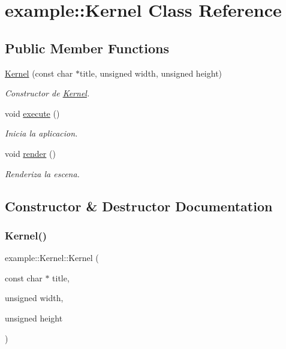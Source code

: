 \hypertarget{classexample_1_1_kernel}{}\section{example\+::Kernel Class Reference}
\label{classexample_1_1_kernel}
\subsection*{Public Member Functions}
\begin{DoxyCompactItemize}
\item 
\mbox{\hyperlink{classexample_1_1_kernel_afe9edad51a71f7cc57829a1f28f38c5f}{Kernel}} (const char $\ast$title, unsigned width, unsigned height)
\begin{DoxyCompactList}\small\item\em Constructor de \mbox{\hyperlink{classexample_1_1_kernel}{Kernel}}. \end{DoxyCompactList}\item 
void \mbox{\hyperlink{classexample_1_1_kernel_a382336839c0317cb39d611c5ee0764ee}{execute}} ()
\begin{DoxyCompactList}\small\item\em Inicia la aplicacion. \end{DoxyCompactList}\item 
void \mbox{\hyperlink{classexample_1_1_kernel_a2b42cf88cc3a1199ea55fab9513108b7}{render}} ()
\begin{DoxyCompactList}\small\item\em Renderiza la escena. \end{DoxyCompactList}\end{DoxyCompactItemize}


\subsection{Constructor \& Destructor Documentation}
\mbox{\label{classexample_1_1_kernel_afe9edad51a71f7cc57829a1f28f38c5f}} 
\subsubsection{\texorpdfstring{Kernel()}{Kernel()}}
{\footnotesize\ttfamily example\+::\+Kernel\+::\+Kernel (\begin{DoxyParamCaption}\item[{const char $\ast$}]{title,  }\item[{unsigned}]{width,  }\item[{unsigned}]{height }\end{DoxyParamCaption})}



